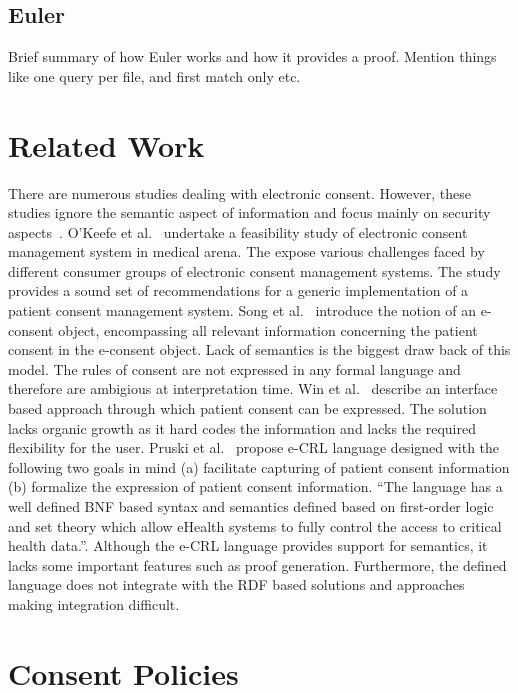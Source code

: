 \documentclass[conference]{IEEEtran}
\begin{document}
\subsection{Euler}

Brief summary of how Euler works and how it provides a proof. Mention things like one query per file, and first match only etc.


\section{Related Work}
\label{rel-work}

There are numerous studies dealing with electronic consent. However, these studies ignore the semantic aspect of information and focus
mainly on security aspects~\cite{reid2003, chen2009identity, blobel2004authorisation}. O'Keefe et al.~\cite{okeefe2002implementation} undertake a feasibility
study of electronic consent management system in medical arena. The expose various challenges faced by different consumer groups of electronic consent
management systems.  The study provides a sound set of recommendations for a generic implementation of a patient consent management system.
Song et al.~\cite{song2002patient} introduce the notion of an e-consent object, encompassing all relevant information concerning the patient consent in the
e-consent object. Lack of semantics is the biggest draw back of this model.  The rules of consent are not expressed in any formal language and therefore are
ambigious at interpretation time.
Win et al.~\cite{win2002implementing} describe an interface based approach through which patient consent can be expressed.  The solution lacks organic growth as
it hard codes the information and lacks the required flexibility for the user.
Pruski et al.~\cite{pruski2010} propose e-CRL language designed with the following two goals in mind (a) facilitate capturing of patient consent information (b)
formalize the expression of patient consent information.  “The language has a well defined BNF based syntax and semantics defined based on first-order logic and
set theory which allow eHealth systems to fully control the access to critical health data.”.  Although the e-CRL language provides support for semantics,
it lacks some important features such as proof generation.  Furthermore, the defined language does not integrate with the RDF based solutions and approaches
making integration difficult.


\section{Consent Policies}
\label{cons-polic}
\end{document}
